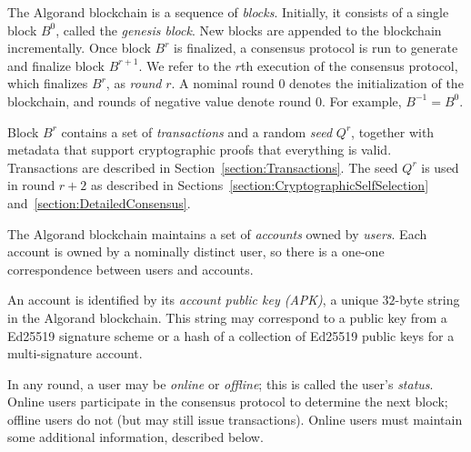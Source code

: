 \documentclass[../main.tex]{subfiles}
\begin{document}
The Algorand blockchain is a sequence of \emph{blocks}.
Initially, it consists of a single block $B^0$, called the \emph{genesis block}.
New blocks are appended to the blockchain incrementally.
Once block $B^r$ is finalized, a consensus protocol is run to generate and finalize block $B^{r+1}$. 
We refer to the $r$th execution of the consensus protocol, which finalizes $B^r$, as \emph{round} $r$.
A nominal round 0 denotes the initialization of the blockchain, 
and rounds of negative value denote round 0.
For example, $B^{-1} = B^0$.

Block $B^r$ contains a set of \emph{transactions} and a random \emph{seed} $Q^r$, 
together with metadata that support cryptographic proofs that everything is valid. 
Transactions are described in Section~\ref{section:Transactions}.
The seed $Q^r$ is used in round $r+2$ 
as described in Sections~\ref{section:CryptographicSelfSelection} and~\ref{section:DetailedConsensus}.

The Algorand blockchain maintains a set of \emph{accounts} owned by \emph{users}.
Each account is owned by a nominally distinct user, 
so there is a one-one correspondence between users and accounts.

An account is identified by its \emph{account public key (APK)}, 
a unique $32$-byte string in the Algorand blockchain.
This string may correspond to a public key from a Ed25519 signature scheme or a hash of a collection of Ed25519 public keys for a multi-signature account. 

In any round, a user may be \emph{online} or \emph{offline};
this is called the user's \emph{status}.
Online users participate in the consensus protocol to determine the next block;
offline users do not (but may still issue transactions).
Online users must maintain some additional information, described below.
\end{document}
